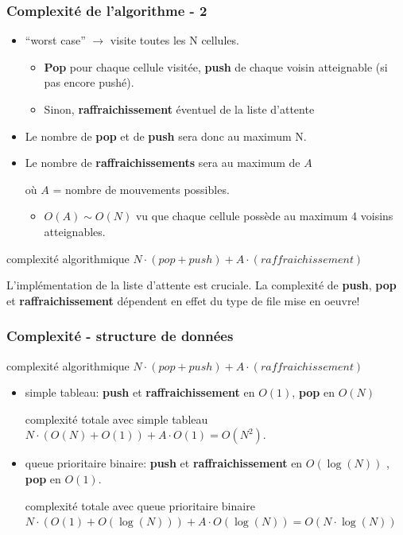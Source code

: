 \documentclass[]{beamer}
\begin{document}
\begin{frame}
  \frametitle{Complexité de l'algorithme - 2}
  \begin{itemize}
  \item ``worst case'' $\rightarrow$ visite toutes les N cellules. 
   \begin{itemize} 
   \item \textbf {Pop} pour chaque cellule visitée, \textbf {push} de chaque voisin atteignable (si pas encore pushé). 
   \item Sinon, \textbf {raffraichissement} éventuel de la liste d'attente 
   \end{itemize}
  \item Le nombre de \textbf {pop} et de \textbf {push} sera donc au maximum N.
  \item Le nombre de \textbf {raffraichissements} sera au maximum de $A$ 

  où $A$ = nombre de mouvements possibles.
    \begin{itemize} 
    \item $O({A}) \sim O({N})$ vu que chaque cellule possède au maximum 4 voisins atteignables.
    \end{itemize}
   \end{itemize}
  \begin{block}{complexité algorithmique}
  $N \cdot (pop + push) + A \cdot (raffraichissement)$
  \end{block}
   L'implémentation de la liste d'attente est cruciale.  La complexité de \textbf {push}, \textbf {pop} et \textbf {raffraichissement} dépendent en effet du type de file mise en oeuvre!
\end{frame}

\begin{frame}
  \frametitle{Complexité - structure de données}
  \begin{block}{complexité algorithmique}
  $N \cdot (pop + push) + A \cdot (raffraichissement)$
  \end{block}
  \begin{itemize}
  \item simple tableau:
  \textbf {push} et \textbf {raffraichissement} en $O(1)$, \textbf {pop} en $O(N)$
  \begin{block}{complexité totale avec simple tableau}
  $N \cdot (O(N) + O(1)) + A \cdot O(1) = O(N^2)$. 
  \end{block}
  \item queue prioritaire binaire:
  \textbf {push} et \textbf {raffraichissement} en $O(\log(N))$ ,  \textbf {pop} en $O(1)$.
  \begin{block}{complexité totale avec queue prioritaire binaire}
  $N \cdot (O(1) + O(\log(N))) + A \cdot O(\log(N)) = O(N \cdot \log(N))$
  \end{block}
  \end{itemize}
\end{frame}
\end{document}
